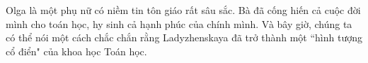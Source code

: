 \begin{multicols}{2}
\begin{figure}[H]
		\vspace*{-10pt}
	\end{figure}
	Olga là một phụ nữ có niềm tin tôn giáo rất  sâu sắc. Bà đã  cống hiến cả cuộc đời mình cho toán học, hy sinh cả hạnh phúc của chính mình. Và bây giờ, chúng ta có thể nói một cách chắc chắn rằng Ladyzhenskaya đã trở thành một ``hình tượng cổ điển" của khoa học Toán học.
\end{multicols}